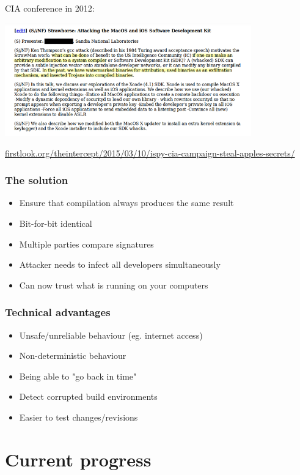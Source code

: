 \documentclass[14pt,aspectratio=169]{beamer}
\begin{document}
\begin{frame}[fragile]
 CIA conference in 2012:
 \begin{center}
  \includegraphics[width=0.8\textwidth]{images/strawhorse.png}

  {\footnotesize
  \url{firstlook.org/theintercept/2015/03/10/ispy-cia-campaign-steal-apples-secrets/}
  }
 \end{center}
\end{frame}

\begin{frame}[fragile]
 \frametitle{The solution} \pause
 \begin{itemize}
  \item Ensure that compilation always produces the same result \pause
  \item Bit-for-bit identical \pause
  \item Multiple parties compare signatures \pause
  \item Attacker needs to infect all developers simultaneously \pause
  \item Can now trust what is running on your computers
 \end{itemize}

\end{frame}
\begin{frame}[fragile]
 \frametitle{Technical advantages} \pause
 \begin{itemize}
  \item Unsafe/unreliable behaviour (eg. internet access)
  \item Non-deterministic behaviour
  \item Being able to "go back in time"
  \item Detect corrupted build environments
  \item Easier to test changes/revisions
 \end{itemize}
\end{frame}


\section{Current progress}
\end{document}
